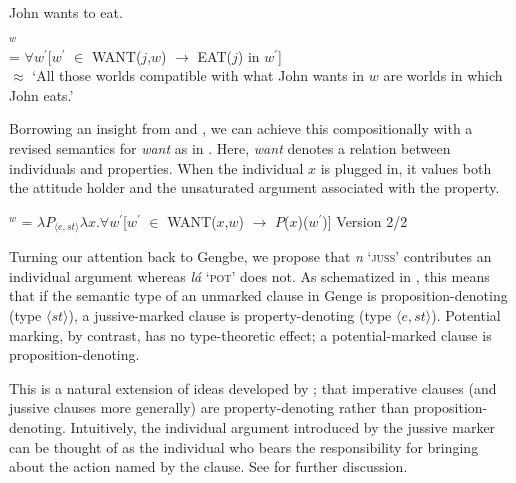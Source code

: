 \documentclass[output=paper,modfonts,nonflat]{langsci/langscibook}
\begin{document}
\ea 
John wants to eat. \label{ex:grano:wcs2:23}
\z

\ea 
{}$^{w}$\\  = $\forall w^{\prime}$[$w^{\prime}$ $\in$ WANT($j$,$w$) $\rightarrow$ EAT($j$) in $w^{\prime}$]\\
$\approx$ `All those worlds compatible with what John wants in $w$ are worlds in which John eats.' \label{ex:grano:wcs:24}
\z

Borrowing an insight from \citet{Chierchi1984} and \citet{Dowty1985}, we can achieve this compositionally with a revised semantics for \emph{want} as in . Here, \emph{want} denotes a relation between individuals and properties. When the individual $x$ is plugged in, it values both the attitude holder and the unsaturated argument associated with the property.

\ea
{}$^{w}$ = $\lambda P_{\langle  e, st\rangle}\lambda x.\forall w^{\prime}$[$w^{\prime}$ $\in$ WANT($x$,$w$) $\rightarrow$ $P$($x$)($w^{\prime}$)] \hfill Version 2/2\label{ex:grano:w2:25}
\z

Turning our attention back to Gengbe, we propose that \emph{n{\É}} `\textsc{juss}' contributes an individual argument whereas \emph{l\'a} `\textsc{pot}' does not. As schematized in , this means that if the semantic type of an unmarked clause in Genge is proposition-denoting (type $\langle st\rangle$), a jussive-marked clause is property-denoting (type $\langle e,st\rangle$). Potential marking, by contrast, has no type-theoretic effect; a potential-marked clause is proposition-denoting. 


\ea \label{ex:grano:mm:26}
    \begin{xlist}
    \end{xlist}
\z

This is a natural extension of ideas developed by \cite{Portner2004, Portner2007}; \cite{Zanuttini2012} that imperative clauses (and jussive clauses more generally) are property-denoting rather than proposition-denoting. Intuitively, the individual argument introduced by the jussive marker can be thought of as the individual who bears the responsibility for bringing about the action named by the clause.  See \cite{GranoToappear} for further discussion.
\end{document}
